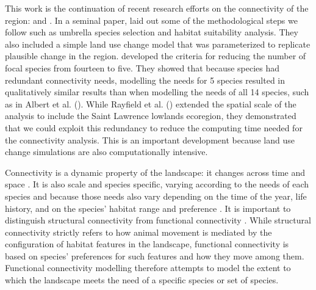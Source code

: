 This work is the continuation of recent research efforts on the connectivity of the region: \cite{albert_applying_2017} and \citep{rayfield_priorisation_2018}. In a seminal paper, \cite{albert_applying_2017} laid out some of the methodological steps we follow such as umbrella species selection and habitat suitability analysis. They also included a simple land use change model that was parameterized to replicate plausible change in the region. \cite{meurant_selecting_2018} developed the criteria for reducing the number of focal species from fourteen to five. They showed that because species had redundant connectivity needs, modelling the needs for 5 species resulted in qualitatively similar results than when modelling the needs of all 14 species, such as in Albert et al. (\citeyear{albert_applying_2017}). While Rayfield et al. (\citeyear{rayfield_priorisation_2018}) extended the spatial scale of the analysis to include the Saint Lawrence lowlands ecoregion, they demonstrated that we could exploit this redundancy to reduce the computing time needed for the connectivity analysis. This is an important development because land use change simulations are also computationally intensive.

Connectivity is a dynamic property of the landscape: it changes across time and space \citep{beyer_functional_2013}. It is also scale and species specific, varying according to the needs of each species and because those needs also vary depending on the time of the year, life history, and on the species’ habitat range and preference \citep{anderson_scale-dependent_2005}. It is important to distinguish structural connectivity from functional connectivity \citep{kindlmann_connectivity_2008}. While structural connectivity strictly refers to how animal movement is mediated by the configuration of habitat features in the landscape, functional connectivity is based on species’ preferences for such features and how they move among them. Functional connectivity modelling therefore attempts to model the extent to which the landscape meets the need of a specific species or set of species.

